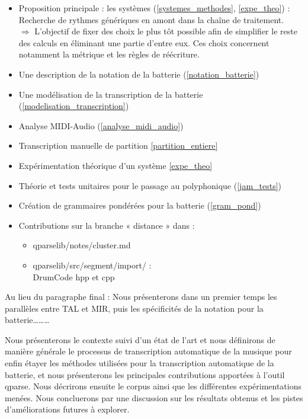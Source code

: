 \begin{itemize}
	\item Proposition principale : les systèmes (\ref{systemes_methodes},
		\ref{expe_theo}) :\\
	Recherche de rythmes génériques en amont dans la chaîne de traitement.\\
	$\Rightarrow$ L’objectif de fixer des choix le plus tôt possible afin de
	simplifier le reste des calculs en éliminant une partie d’entre eux. Ces
	choix concernent notamment la métrique et les règles de réécriture.
	\item Une description de la notation de la batterie
		(\ref{notation_batterie})
	\item Une modélisation de la transcription de la batterie
		(\ref{modelisation_transcription})
	\item Analyse MIDI-Audio (\ref{analyse_midi_audio})
	\item Transcription manuelle de partition \ref{partition_entiere}
	\item Expérimentation théorique d’un système \ref{expe_theo}
	\item Théorie et tests unitaires pour le passage au polyphonique
		(\ref{jam_tests})
	\item Création de grammaires pondérées pour la batterie (\ref{gram_pond})
	\item Contributions sur la branche « distance » dans :
	\begin{itemize}
		\item qparselib/notes/cluster.md
		\item qparselib/src/segment/import/ :\\
		DrumCode hpp et cpp\\
	\end{itemize}
\end{itemize}

Au lieu du paragraphe final : Nous présenterons dans un premier temps les
parallèles entre TAL et MIR, puis les spécificités de la notation pour la
batterie……… 

Nous présenterons le contexte suivi d’un état de l’art et nous définirons de
manière générale le processus de transcription automatique de la musique pour
enfin étayer les méthodes utilisées pour la transcription automatique de la
batterie, et nous présenterons les principales contributions apportées à
l’outil qparse. Nous décrirons ensuite le corpus ainsi que les différentes
expérimentations menées. Nous concluerons par une discussion sur les résultats
obtenus et les pistes d’améliorations futures à explorer.
